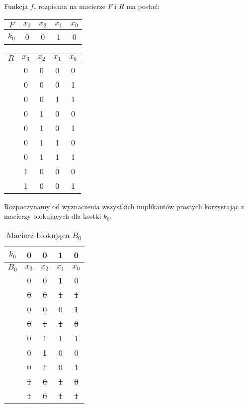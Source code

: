 \setcounter{implicant_counter}{0}

Funkcja $f_c$ rozpisana na macierze $F$ i $R$ ma postać:
\begin{center}
    \begin{tabular}[t]{ |c|c c c c|}
        \hline
        $F$ & $x_3$ & $x_2$ & $x_1$ & $x_0$ \\
        \hline
        $k_0$ & 0 & 0 & 1 & 0 \\
        \hline
    \end{tabular}
    \hspace{1cm}
    \begin{tabular}[t]{ |c|c c c c| }
        \hline
        $R$ & $x_3$ & $x_2$ & $x_1$ & $x_0$ \\
        \hline
        & 0 & 0 & 0 & 0 \\
        & 0 & 0 & 0 & 1 \\
        & 0 & 0 & 1 & 1 \\
        & 0 & 1 & 0 & 0 \\
        & 0 & 1 & 0 & 1 \\
        & 0 & 1 & 1 & 0 \\
        & 0 & 1 & 1 & 1 \\
        & 1 & 0 & 0 & 0 \\
        & 1 & 0 & 0 & 1 \\
        \hline
    \end{tabular}
\end{center}

Rozpoczynamy od wyznaczenia wszystkich implikantów prostych korzystając z macierzy blokujących dla kostki
$k_0$.

\begin{table}[H]
    \centering
    \begin{tabular}[t]{ |c|c c c c| }
        \hline
        $k_0$ & 0 & 0 & 1 & 0 \\
        \hline\hline
        $B_0$ & $x_3$ & $x_2$ & $x_1$ & $x_0$ \\
        \hline
        & 0 & 0 & \textbf{1} & 0 \\
        & \sout{0} & \sout{0} & \sout{1} & \sout{1} \\
        & 0 & 0 & 0 & \textbf{1} \\
        & \sout{0} & \sout{1} & \sout{1} & \sout{0} \\
        & \sout{0} & \sout{1} & \sout{1} & \sout{1} \\
        & 0 & \textbf{1} & 0 & 0 \\
        & \sout{0} & \sout{1} & \sout{0} & \sout{1} \\
        & \sout{1} & \sout{0} & \sout{1} & \sout{0} \\
        & \sout{1} & \sout{0} & \sout{1} & \sout{1} \\
        \hline
    \end{tabular}
    \caption{Macierz blokująca $B_0$} \label{tab:b0c}
\end{table}

